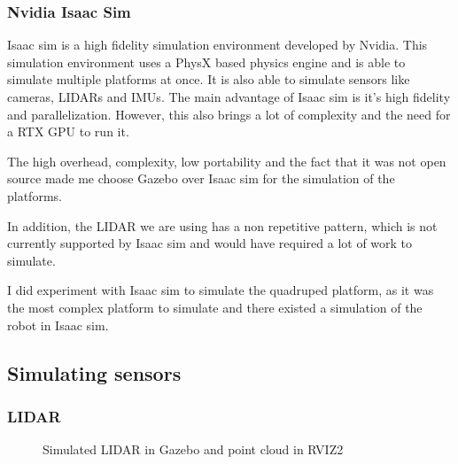 \documentclass[11pt]{article}
\begin{document}
        \subsubsection{Nvidia Isaac Sim}

            Isaac sim is a high fidelity simulation environment developed by Nvidia. This simulation environment uses a PhysX based physics engine and is able to simulate multiple platforms at once. It is also able to simulate sensors like cameras, LIDARs and IMUs. The main advantage of Isaac sim is it's high fidelity and parallelization. However, this also brings a lot of complexity and the need for a RTX GPU to run it.

            The high overhead, complexity, low portability and the fact that it was not open source made me choose Gazebo over Isaac sim for the simulation of the platforms.

            In addition, the LIDAR we are using has a non repetitive pattern, which is not currently supported by Isaac sim and would have required a lot of work to simulate.

            I did experiment with Isaac sim to simulate the quadruped platform, as it was the most complex platform to simulate and there existed a simulation of the robot in Isaac sim.
    \subsection{Simulating sensors}
        \subsubsection{LIDAR}

        \begin{figure}[H]
            \centering
            \caption{Simulated LIDAR in Gazebo and point cloud in RVIZ2}
        \end{figure}
\end{document}
